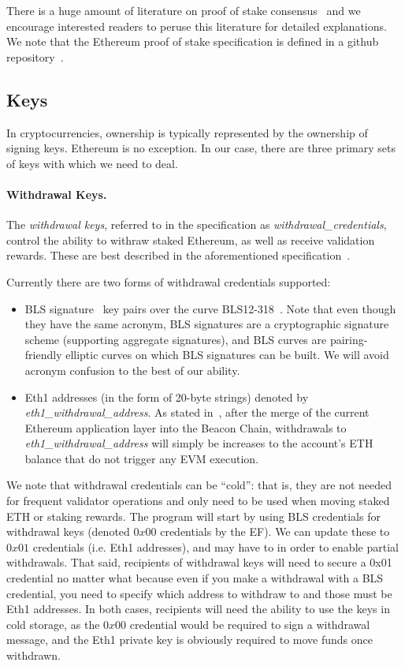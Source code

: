 There is a huge amount of literature on proof of stake consensus~\cite{buterin2017casper,C:KRDO17,FC:DaiPasShi19} and we encourage interested readers to peruse this literature for detailed explanations.  We note that the Ethereum proof of stake specification is defined in a github repository~\cite{EthVal}.

\subsection{Keys}
In cryptocurrencies, ownership is typically represented by the ownership of signing keys.  Ethereum is no exception.  In our case, there are three primary sets of keys with which we need to deal.

\paragraph{Withdrawal Keys.}  The \emph{withdrawal keys}, referred to in the specification as \emph{withdrawal\_credentials}, control the ability to withraw staked Ethereum, as well as receive validation rewards.  These are best described in the aforementioned specification~\cite{EthVal}.

Currently there are two forms of withdrawal credentials supported:
\begin{itemize}
\item BLS signature~\cite{AC:BonLynSha01} key pairs over the curve BLS12-318~\cite{barreto2002constructing,BLS12-318}.  Note that even though they have the same acronym, BLS signatures are a cryptographic signature scheme (supporting aggregate signatures), and BLS curves are pairing-friendly elliptic curves on which BLS signatures can be built.  We will avoid acronym confusion to the best of our ability.
\item Eth1 addresses (in the form of 20-byte strings) denoted by \emph{eth1\_withdrawal\_address}.  As stated in~\cite{EthVal}, after the merge of the current Ethereum application layer into the Beacon Chain, withdrawals to \emph{eth1\_withdrawal\_address} will simply be increases to the account's ETH balance that do not trigger any EVM execution.
\end{itemize}

We note that withdrawal credentials can be ``cold'':  that is, they are not needed for frequent validator operations and only need to be used when moving staked ETH or staking rewards.  The program will start by using BLS credentials for withdrawal keys (denoted $0x00$ credentials by the EF). We can update these to $0x01$ credentials (i.e. Eth1 addresses), and may have to in order to enable partial withdrawals. That said, recipients of withdrawal keys will need to secure a 0x01 credential no matter what because even if you make a withdrawal with a BLS credential, you need to specify which address to withdraw to and those must be Eth1 addresses. In both cases, recipients will need the ability to use the keys in cold storage, as the $0x00$ credential would be required to sign a withdrawal message, and the Eth1 private key is obviously required to move funds once withdrawn. 


